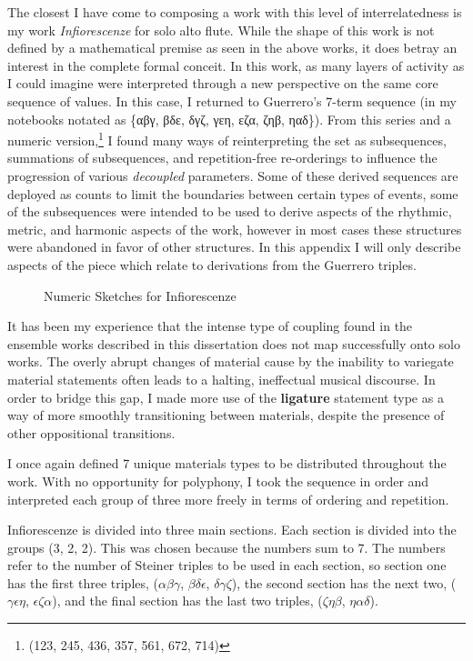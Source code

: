 The closest I have come to composing a work with this level of interrelatedness is my work \textit{Infiorescenze} for solo alto flute. While the shape of this work is not defined by a mathematical premise as seen in the above works, it does betray an interest in the complete formal conceit. In this work, as many layers of activity as I could imagine were interpreted through a new perspective on the same core sequence of values. In this case, I returned to Guerrero's 7-term sequence (in my notebooks notated as \{αβγ, βδε, δγζ, γεη, εζα, ζηβ, ηαδ\}). From this series and a numeric version,\footnote{(123, 245, 436, 357, 561, 672, 714)} I found many ways of reinterpreting the set as subsequences, summations of subsequences, and repetition-free re-orderings to influence the progression of various \textit{decoupled} parameters. Some of these derived sequences are deployed as counts to limit the boundaries between certain types of events, some of the subsequences were intended to be used to derive aspects of the rhythmic, metric, and harmonic aspects of the work, however in most cases these structures were abandoned in favor of other structures. In this appendix I will only describe aspects of the piece which relate to derivations from the Guerrero triples.

\begin{figure}[H]
    \centering
    \caption{Numeric Sketches for Infiorescenze}
    \label{fig:inf-numbers}
\end{figure}

It has been my experience that the intense type of coupling found in the ensemble works described in this dissertation does not map successfully onto solo works. The overly abrupt changes of material cause by the inability to variegate material statements often leads to a halting, ineffectual musical discourse. In order to bridge this gap, I made more use of the \textbf{ligature} statement type as a way of more smoothly transitioning between materials, despite the presence of other oppositional transitions.

I once again defined 7 unique materials types to be distributed throughout the work. With no opportunity for polyphony, I took the sequence in order and interpreted each group of three more freely in terms of ordering and repetition.

Infiorescenze is divided into three main sections. Each section is divided into the groups (3, 2, 2). This was chosen because the numbers sum to 7. The numbers refer to the number of Steiner triples to be used in each section, so section one has the first three triples, ($\alpha\beta\gamma$, $\beta\delta\epsilon$, $\delta\gamma\zeta$), the second section has the next two, ($\gamma\epsilon\eta$, $\epsilon\zeta\alpha$), and the final section has the last two triples, ($\zeta\eta\beta$, $\eta\alpha\delta$).

